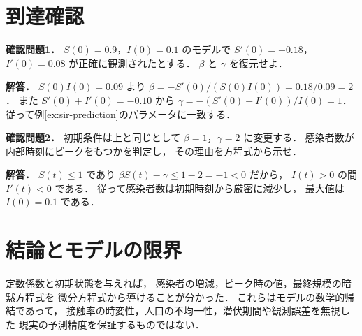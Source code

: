 \documentclass[a5paper,10pt,onecolumn]{jsarticle}
\theoremstyle{mathnotetheorem}
\begin{document}
\section*{到達確認}
\noindent\textbf{確認問題1．}
$S(0)=0.9$，$I(0)=0.1$ のモデルで
$S'(0)=-0.18$，$I'(0)=0.08$ が正確に観測されたとする．
$\beta$ と $\gamma$ を復元せよ．

\medskip\noindent\textbf{解答．}
$S(0)I(0)=0.09$ より
$\beta=-S'(0)/(S(0)I(0))=0.18/0.09=2$．
また $S'(0)+I'(0)=-0.10$ から
$\gamma=-(S'(0)+I'(0))/I(0)=1$．
従って例\ref{ex:sir-prediction}のパラメータに一致する．

\medskip\noindent\textbf{確認問題2．}
初期条件は上と同じとして $\beta=1$，$\gamma=2$ に変更する．
感染者数が内部時刻にピークをもつかを判定し，
その理由を方程式から示せ．

\medskip\noindent\textbf{解答．}
$S(t)\le1$ であり
$\beta S(t)-\gamma\le1-2=-1<0$ だから，
$I(t)>0$ の間 $I'(t)<0$ である．
従って感染者数は初期時刻から厳密に減少し，
最大値は $I(0)=0.1$ である．

\section*{結論とモデルの限界}
\noindent 定数係数と初期状態を与えれば，
感染者の増減，ピーク時の値，最終規模の暗黙方程式を
微分方程式から導けることが分かった．
これらはモデルの数学的帰結であって，
接触率の時変性，人口の不均一性，潜伏期間や観測誤差を無視した
現実の予測精度を保証するものではない．
\end{document}
